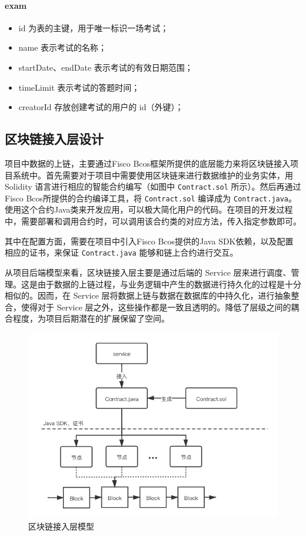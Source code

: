 \paragraph{exam}
\begin{itemize}
    \item id 为表的主键，用于唯一标识一场考试；
    \item name 表示考试的名称；
    \item startDate、endDate 表示考试的有效日期范围；
    \item timeLimit 表示考试的答题时间；
    \item creatorId 存放创建考试的用户的 id（外键）；
\end{itemize}

\subsection{区块链接入层设计}
项目中数据的上链，主要通过Fisco Bcos框架所提供的底层能力来将区块链接入项目系统中。首先需要对于项目中需要使用区块链来进行数据维护的业务实体，用 Solidity 语言进行相应的智能合约编写（如图中 \lstinline!Contract.sol! 所示）。然后再通过Fisco Bcos所提供的合约编译工具，将 \lstinline!Contract.sol! 编译成为 \lstinline!Contract.java!。使用这个合约Java类来开发应用，可以极大简化用户的代码。在项目的开发过程中，需要部署和调用合约时，可以调用该合约类的对应方法，传入指定参数即可。

其中在配置方面，需要在项目中引入Fisco Bcos提供的Java SDK依赖，以及配置相应的证书，来保证 \lstinline!Contract.java! 能够和链上合约进行交互。

从项目后端模型来看，区块链接入层主要是通过后端的 Service 层来进行调度、管理。这是由于数据的上链过程，与业务逻辑中产生的数据进行持久化的过程是十分相似的。因而，在 Service 层将数据上链与数据在数据库的中持久化，进行抽象整合，使得对于 Service 层之外，这些操作都是一致且透明的。降低了层级之间的耦合程度，为项目后期潜在的扩展保留了空间。

\begin{figure}[htb]
    \centering
    \includegraphics[width=0.85\linewidth]{_images/区块链接入层模型.png}
    \caption{区块链接入层模型}
\end{figure}


